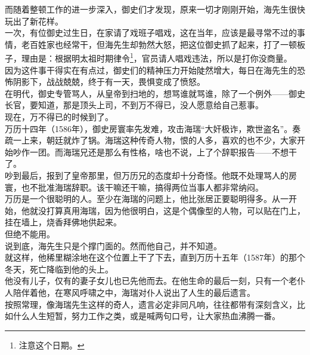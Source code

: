 \begin{multicols}{\theparacolNo}
而随着整顿工作的进一步深入，御史们才发现，原来一切才刚刚开始，海先生很快玩出了新花样。\\

一次，有位御史过生日，在家请了戏班子唱戏，这在当年，应该是最寻常不过的事情，老百姓家也经常干，但海先生却勃然大怒，把这位御史抓了起来，打了一顿板子，理由是：根据明太祖时期律令\footnote{注意这个日期。}，官员请人唱戏违法，所以是打你没商量。\\

因为这件事干得实在有点过，御史们的精神压力开始陡然增大，每日在海先生的恐怖阴影下，战战兢兢，终于有一天，畏惧变成了愤怒。\\

在明代，御史专管骂人，从皇帝到扫地的，想骂谁就骂谁，除了一个例外——御史长官，要知道，那是顶头上司，不到万不得已，没人愿意给自己惹事。\\

现在，万不得已的时候到了。\\

万历十四年（1586年），御史房寰率先发难，攻击海瑞“大奸极诈，欺世盗名”。奏疏一上来，朝廷就炸了锅。海瑞这种传奇人物，恨的人多，喜欢的也不少，大家开始吵作一团。而海瑞兄还是那么有性格，啥也不说，上了个辞职报告——不想干了。\\

吵到最后，报到了皇帝那里，但万历兄的态度却十分奇怪。他既不处理骂人的房寰，也不批准海瑞辞职。该干嘛还干嘛，搞得两位当事人都非常纳闷。\\

万历是一个很聪明的人。至少在海瑞的问题上，他比张居正要聪明得多。从一开始，他就没打算真用海瑞，因为他很明白，这是个偶像型的人物，可以贴在门上，挂在墙上，烧香拜佛地供起来。\\

但绝不能用。\\

说到底，海先生只是个撑门面的。然而他自己，并不知道。\\

就这样，他稀里糊涂地在这个位置上干了下去，直到万历十五年（1587年）的那个冬天，死亡降临到他的头上。\\

他没有儿子，仅有的妻子女儿也已先他而去。在他生命的最后一刻，只有一个老仆人陪伴着他，在寒风呼啸之中，海瑞对仆人说出了人生的最后遗言。\\

按照常理，像海瑞先生这样的奇人，遗言必定非同凡响，往往都带有深刻含义，比如什么人生短暂，努力工作之类，或是喊两句口号，让大家热血沸腾一番。\\


\end{multicols}

